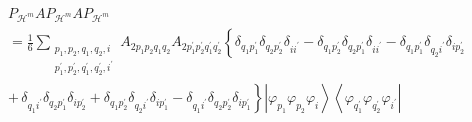 \documentclass[aps,preprint]{revtex4}%
\begin{document}
\begin{align}
&  P_{\mathcal{H}^{m}}AP_{\mathcal{H}^{m}}AP_{\mathcal{H}^{m}}\nonumber\\
&  \left.  =\right.  \frac{1}{6}\sum_{\substack{p_{1},p_{2},q_{1}%
,q_{2},i\\p_{1}^{\prime},p_{2}^{\prime},q_{1}^{\prime},q_{2}^{\prime
},i^{\prime}}}A_{2p_{1}p_{2}q_{1}q_{2}}A_{2p_{1}^{\prime}p_{2}^{\prime}%
q_{1}^{\prime}q_{2}^{\prime}}\left\{  \delta_{q_{1}p_{1}^{\prime}}%
\delta_{q_{2}p_{2}^{\prime}}\delta_{ii^{\prime}}-\delta_{q_{1}p_{2}^{\prime}%
}\delta_{q_{2}p_{1}^{\prime}}\delta_{ii^{\prime}}-\delta_{q_{1}p_{1}^{\prime}%
}\delta_{q_{2}i^{\prime}}\delta_{ip_{2}^{\prime}}\right.  \nonumber\\
&  \left.  +\,\delta_{q_{1}i^{\prime}}\delta_{q_{2}p_{1}^{\prime}}%
\delta_{ip_{2}^{\prime}}+\delta_{q_{1}p_{2}^{\prime}}\delta_{q_{2}i^{\prime}%
}\delta_{ip_{1}^{\prime}}-\delta_{q_{1}i^{\prime}}\delta_{q_{2}p_{2}^{\prime}%
}\delta_{ip_{1}^{\prime}}\right\}  \left\vert \varphi_{p_{1}}\varphi_{p_{2}%
}\varphi_{i}\right\rangle \left\langle \varphi_{q_{1}^{\prime}}\varphi
_{q_{2}^{\prime}}\varphi_{i^{\prime}}\right\vert
\end{align}%
\end{document}
